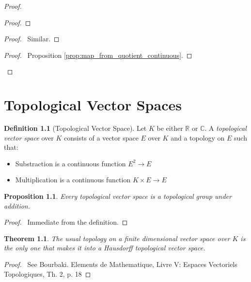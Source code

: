 \documentclass{book}
\let\qed\relax
\newtheorem{prop}[ax]{Proposition}
\newtheorem{thm}[ax]{Theorem}
\theoremstyle{definition}
\newtheorem{df}[ax]{Definition}
\newcommand{\inv}[1]{\ensuremath{{#1}^{-1}}}
\begin{document}
\begin{proof}
\pf
{}
\begin{proof}
	\step{b}{$\inv{g}h \in G_x$}
	\step{c}{$\inv{g}h x = x$}
\end{proof}
\begin{proof}
	\pf\ Similar.
\end{proof}
\begin{proof}
	\pf\ Proposition \ref{prop:map_from_quotient_continuous}.
\end{proof}
\qed
\end{proof}

\chapter{Topological Vector Spaces}

\begin{df}[Topological Vector Space]
Let $K$ be either $\mathbb{R}$ or $\mathbb{C}$. A \emph{topological vector space} over $K$ consists of a 	vector space $E$ over $K$ and a topology on $E$ such that:
\begin{itemize}
\item Substraction is a continuous function $E^2 \rightarrow E$
\item Multiplication is a continuous function $K \times E \rightarrow E$
\end{itemize}
\end{df}

\begin{prop}
Every topological vector space is a topological group under addition.
\end{prop}

\begin{proof}
\pf\ Immediate from the definition. \qed
\end{proof}

\begin{thm}
The usual topology on a finite dimensional vector space over $K$ is the only one that makes it into a Hausdorff topological vector space.
\end{thm}

\begin{proof}
\pf\ See Bourbaki. Elements de Mathematique, Livre V: Espaces Vectoriels Topologiques, Th. 2, p. 18 \qed
\end{proof}
\end{document}
